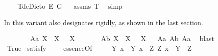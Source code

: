\begin{isabellebody}
\ \ \ \ T{}{\isacharunderscore}deDicto{\isacharcolon}\ {\isachardoublequoteopen}{\isasymlfloor}\isactrlbold {\isasymdiamond}\isactrlbold {\isasymexists}\isactrlsup E\ \isactrlbold {\isasymdown}G{\isasymrfloor}{\isachardoublequoteclose}%
\ %
%
\isamarkupfalse%
\ assms\ T{}\ \isamarkupfalse%
\ simp%
%
%
%
\isamarkuptrue%
%
\begin{isamarkuptext}%
In this variant \isa{{\isasymP}} also designates rigidly, as shown in the last section.%
\end{isamarkuptext}\isamarkuptrue%
\isamarkupfalse%
\ \isanewline
\ \ \ \ \ \ A{}a{\isacharcolon}\ {\isachardoublequoteopen}{\isasymlfloor}\isactrlbold {\isasymforall}X{\isachardot}\ {\isasymP}\ X\ \isactrlbold {\isasymrightarrow}\ \isactrlbold {\isasymbox}{\isacharparenleft}{\isasymP}\ X{\isacharparenright}{\isasymrfloor}{\isachardoublequoteclose}\ \ \ \ \ \ %
\isanewline
{}\isamarkupfalse%
\ A{}b{\isacharcolon}\ {\isachardoublequoteopen}{\isasymlfloor}\isactrlbold {\isasymforall}X{\isachardot}\ \isactrlbold {\isasymnot}{\isacharparenleft}{\isasymP}\ X{\isacharparenright}\ \isactrlbold {\isasymrightarrow}\ \isactrlbold {\isasymbox}\isactrlbold {\isasymnot}{\isacharparenleft}{\isasymP}\ X{\isacharparenright}{\isasymrfloor}{\isachardoublequoteclose}%
\ %
%
\isamarkupfalse%
\ A{}a\ A{}b\ A{}a\ \isamarkupfalse%
\ blast%
%
%
\isanewline
\ \ \ \ \isanewline
{}\isamarkupfalse%
\ True\ \isamarkupfalse%
{\isacharbrackleft}satisfy{\isacharbrackright}%
\ %
%
\isamarkupfalse%
\ %
%
%
%
\isanewline
\isanewline
{}\isamarkupfalse%
\ essenceOf{\isacharcolon}{\isacharcolon}{\isachardoublequoteopen}{\isasymup}{\isasymlangle}{\isasymlangle}{\isasymzero}{\isasymrangle}{\isacharcomma}{\isasymzero}{\isasymrangle}{\isachardoublequoteclose}\ {\isacharparenleft}{\isachardoublequoteopen}{\isasymE}{\isachardoublequoteclose}{\isacharparenright}\ \isanewline
\ \ {\isachardoublequoteopen}{\isasymE}\ Y\ x\ {\isasymequiv}\ {\isasymlparr}Y\ x{\isasymrparr}\ \isactrlbold {\isasymand}\ {\isacharparenleft}\isactrlbold {\isasymforall}Z{\isacharcolon}{\isacharcolon}{\isasymlangle}{\isasymzero}{\isasymrangle}{\isachardot}\ {\isasymlparr}Z\ x{\isasymrparr}\ \isactrlbold {\isasymrightarrow}\ Y\ {\isasymRrightarrow}\ Z{\isacharparenright}{\isachardoublequoteclose}%

\end{isabellebody}
